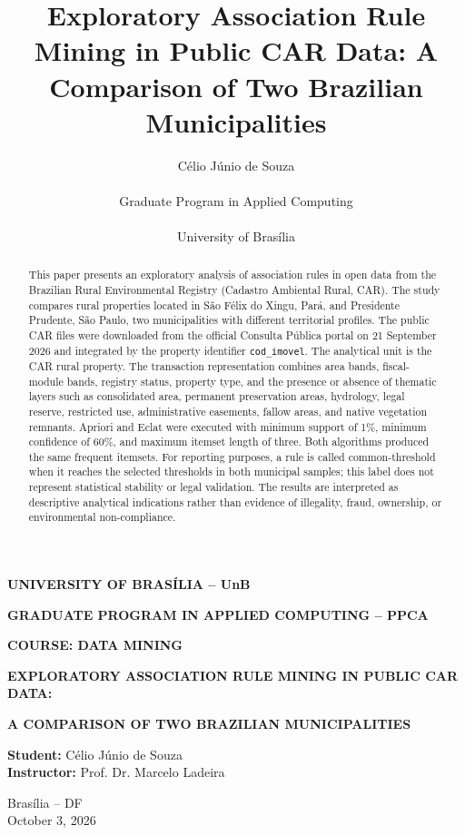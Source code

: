 \documentclass[11pt]{article}
\title{Exploratory Association Rule Mining in Public CAR Data: A Comparison of Two Brazilian Municipalities}
\author{Célio Júnio de Souza \\\\
  Graduate Program in Applied Computing \\\\
  University of Brasília}
\begin{document}
\begin{titlepage}
\thispagestyle{empty}
\begin{center}
    \textbf{UNIVERSITY OF BRASÍLIA -- UnB}

    \vspace{0.4cm}

    \textbf{GRADUATE PROGRAM IN APPLIED COMPUTING -- PPCA}

    \vfill

    \textbf{COURSE: DATA MINING}

    \vspace{1.5cm}

    \textbf{EXPLORATORY ASSOCIATION RULE MINING IN PUBLIC CAR DATA:}

    \vspace{0.25cm}

    \textbf{A COMPARISON OF TWO BRAZILIAN MUNICIPALITIES}

    \vfill

    \textbf{Student:} Célio Júnio de Souza\\
    \textbf{Instructor:} Prof. Dr. Marcelo Ladeira

    \vfill

    Brasília -- DF\\
    October 3, 2026
\end{center}
\end{titlepage}

\clearpage
\maketitle

\begin{abstract}
This paper presents an exploratory analysis of association rules in open data from the Brazilian Rural Environmental Registry (Cadastro Ambiental Rural, CAR). The study compares rural properties located in São Félix do Xingu, Pará, and Presidente Prudente, São Paulo, two municipalities with different territorial profiles. The public CAR files were downloaded from the official Consulta Pública portal on 21 September 2026 and integrated by the property identifier \texttt{cod\_imovel}. The analytical unit is the CAR rural property. The transaction representation combines area bands, fiscal-module bands, registry status, property type, and the presence or absence of thematic layers such as consolidated area, permanent preservation areas, hydrology, legal reserve, restricted use, administrative easements, fallow areas, and native vegetation remnants. Apriori and Eclat were executed with minimum support of 1\%, minimum confidence of 60\%, and maximum itemset length of three. Both algorithms produced the same frequent itemsets. For reporting purposes, a rule is called common-threshold when it reaches the selected thresholds in both municipal samples; this label does not represent statistical stability or legal validation. The results are interpreted as descriptive analytical indications rather than evidence of illegality, fraud, ownership, or environmental non-compliance.
\end{abstract}
\end{document}
